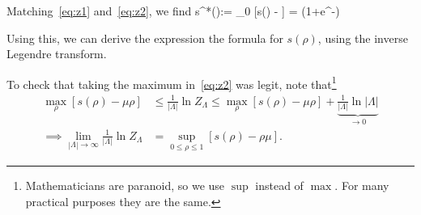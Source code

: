 \documentclass[12pt]{book}
\theoremstyle{norm}
\begin{document}
Matching~\eqref{eq:z1} and~\eqref{eq:z2}, we find
\be
s^*(\mu):= \max_{0\le \rho{}} [s(\rho) - \mu\rho] = \ln (1+e^{-\mu})
\ee


Using this, we can derive the expression the formula for $s(\rho)$, using the inverse Legendre transform.

To check that taking the maximum in~\eqref{eq:z2} was legit, note that\footnote{Mathematicians are paranoid, so we use $\sup$ instead of $\max$. For many practical purposes they are the same.}
\begin{align*}%
\max_{\rho}[s(\rho) - \mu \rho] &\le \frac{1}{|\Lambda|}\ln Z_{\Lambda} \le \max_\rho [s(\rho)-\mu \rho] + \underbrace{\frac{1}{|\Lambda|}\ln |\Lambda|}_{\to 0}\\
\implies
\lim_{|\Lambda|\to \infty} \frac{1}{|\Lambda|}\ln Z_{\Lambda} &= \sup_{0\le \rho\le 1} [s(\rho) - \rho \mu].
\end{align*}

\end{document}
